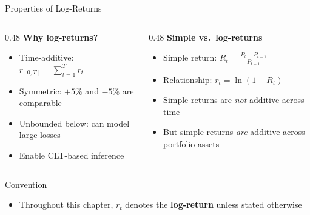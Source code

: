 \documentclass[9pt, aspectratio=169, t]{beamer}
\theoremstyle{definition}
\begin{document}
\begin{frame}{Properties of Log-Returns}
\begin{columns}[T]
\begin{column}{0.48\textwidth}
\textbf{Why log-returns?}
\begin{itemize}
\item Time-additive: $r_{[0,T]} = \sum_{t=1}^{T} r_t$
\item Symmetric: $+5\%$ and $-5\%$ are comparable
\item Unbounded below: can model large losses
\item Enable CLT-based inference
\end{itemize}
\end{column}
\begin{column}{0.48\textwidth}
\textbf{Simple vs.\ log-returns}
\begin{itemize}
\item Simple return: $R_t = \frac{P_t - P_{t-1}}{P_{t-1}}$
\item Relationship: $r_t = \ln(1 + R_t)$
\item Simple returns are \textit{not} additive across time
\item But simple returns \textit{are} additive across portfolio assets
\end{itemize}
\end{column}
\end{columns}

\vspace{0.3cm}
\begin{exampleblock}{Convention}
\begin{itemize}
\item Throughout this chapter, $r_t$ denotes the \textbf{log-return} unless stated otherwise
\end{itemize}
\end{exampleblock}
\end{frame}
\end{document}
